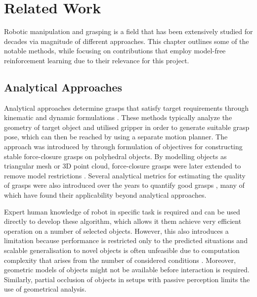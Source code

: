\chapter{Related Work}

Robotic manipulation and grasping is a field that has been extensively studied for decades via magnitude of different approaches. This chapter outlines some of the notable methods, while focusing on contributions that employ model-free reinforcement learning due to their relevance for this project.


\section{Analytical Approaches}

Analytical approaches determine grasps that satisfy target requirements through kinematic and dynamic formulations \cite{sahbani_overview_2012}. These methods typically analyze the geometry of target object and utilised gripper in order to generate suitable grasp pose, which can then be reached by using a separate motion planner. The approach was introduced by \citet{nguyen_constructing_1987} through formulation of objectives for constructing stable force-closure grasps on polyhedral objects. By modelling objects as triangular mesh or 3D point cloud, force-closure grasps were later extended to remove model restrictions \cite{yun-hui_liu_complete_2004}. Several analytical metrics for estimating the quality of grasps were also introduced over the years to quantify good grasps \cite{roa_grasp_2015}, many of which have found their applicability beyond analytical approaches.

Expert human knowledge of robot in specific task is required and can be used directly to develop these algorithm, which allows it them achieve very efficient operation on a number of selected objects. However, this also introduces a limitation because performance is restricted only to the predicted situations and scalable generalisation to novel objects is often unfeasible due to computation complexity that arises from the number of considered conditions \cite{sahbani_overview_2012}. Moreover, geometric models of objects might not be available before interaction is required. Similarly, partial occlusion of objects in setups with passive perception limits the use of geometrical analysis.

